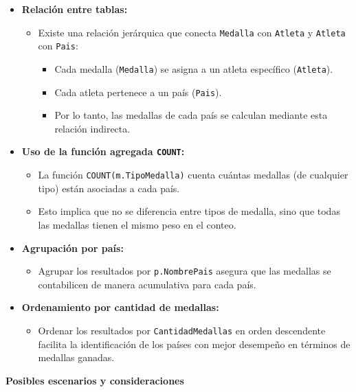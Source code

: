 \begin{itemize} \item \textbf{Relación entre tablas:} \begin{itemize} \item Existe una relación jerárquica que conecta \texttt{Medalla} con \texttt{Atleta} y \texttt{Atleta} con \texttt{Pais}: \begin{itemize} \item Cada medalla (\texttt{Medalla}) se asigna a un atleta específico (\texttt{Atleta}). \item Cada atleta pertenece a un país (\texttt{Pais}). \item Por lo tanto, las medallas de cada país se calculan mediante esta relación indirecta. \end{itemize} \end{itemize}
	
	\item \textbf{Uso de la función agregada \texttt{COUNT}:} \begin{itemize} \item La función \texttt{COUNT(m.TipoMedalla)} cuenta cuántas medallas (de cualquier tipo) están asociadas a cada país. \item Esto implica que no se diferencia entre tipos de medalla, sino que todas las medallas tienen el mismo peso en el conteo. \end{itemize}
	
	\item \textbf{Agrupación por país:} \begin{itemize} \item Agrupar los resultados por \texttt{p.NombrePais} asegura que las medallas se contabilicen de manera acumulativa para cada país. \end{itemize}
	
	\item \textbf{Ordenamiento por cantidad de medallas:} \begin{itemize} \item Ordenar los resultados por \texttt{CantidadMedallas} en orden descendente facilita la identificación de los países con mejor desempeño en términos de medallas ganadas. \end{itemize} \end{itemize}

\textbf{Posibles escenarios y consideraciones}


